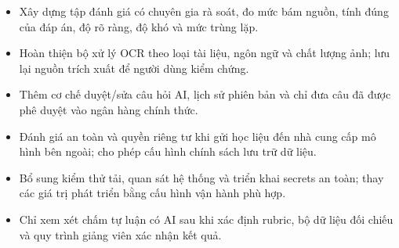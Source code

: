 \begin{itemize}[leftmargin=1.6em, itemsep=3pt]
  \item Xây dựng tập đánh giá có chuyên gia rà soát, đo mức bám nguồn, tính
        đúng của đáp án, độ rõ ràng, độ khó và mức trùng lặp.
  \item Hoàn thiện bộ xử lý OCR theo loại tài liệu, ngôn ngữ và chất lượng
        ảnh; lưu lại nguồn trích xuất để người dùng kiểm chứng.
  \item Thêm cơ chế duyệt/sửa câu hỏi AI, lịch sử phiên bản và chỉ đưa câu
        đã được phê duyệt vào ngân hàng chính thức.
  \item Đánh giá an toàn và quyền riêng tư khi gửi học liệu đến nhà cung cấp
        mô hình bên ngoài; cho phép cấu hình chính sách lưu trữ dữ liệu.
  \item Bổ sung kiểm thử tải, quan sát hệ thống và triển khai secrets an toàn;
        thay các giá trị phát triển bằng cấu hình vận hành phù hợp.
  \item Chỉ xem xét chấm tự luận có AI sau khi xác định rubric, bộ dữ liệu
        đối chiếu và quy trình giảng viên xác nhận kết quả.
\end{itemize}
